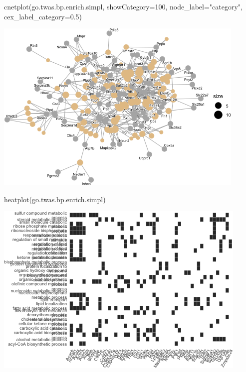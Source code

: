 \documentclass[
]{article}
\newenvironment{Shaded}{\begin{snugshade}}{\end{snugshade}}
\newcommand{\AttributeTok}[1]{\textcolor[rgb]{0.77,0.63,0.00}{#1}}
\newcommand{\DecValTok}[1]{\textcolor[rgb]{0.00,0.00,0.81}{#1}}
\newcommand{\FloatTok}[1]{\textcolor[rgb]{0.00,0.00,0.81}{#1}}
\newcommand{\FunctionTok}[1]{\textcolor[rgb]{0.00,0.00,0.00}{#1}}
\newcommand{\NormalTok}[1]{#1}
\newcommand{\StringTok}[1]{\textcolor[rgb]{0.31,0.60,0.02}{#1}}
\begin{document}
\begin{Shaded}
\begin{Highlighting}[]
\FunctionTok{cnetplot}\NormalTok{(go.twas.bp.enrich.simpl, }
         \AttributeTok{showCategory=}\DecValTok{100}\NormalTok{,}
         \AttributeTok{node\_label=}\StringTok{"category"}\NormalTok{,}
         \AttributeTok{cex\_label\_category=}\FloatTok{0.5}\NormalTok{)}
\end{Highlighting}
\end{Shaded}

\includegraphics{figures/twas-go-ncd-4.png}

\begin{Shaded}
\begin{Highlighting}[]
\FunctionTok{heatplot}\NormalTok{(go.twas.bp.enrich.simpl)}
\end{Highlighting}
\end{Shaded}

\includegraphics{figures/twas-go-ncd-5.png}
\end{document}
